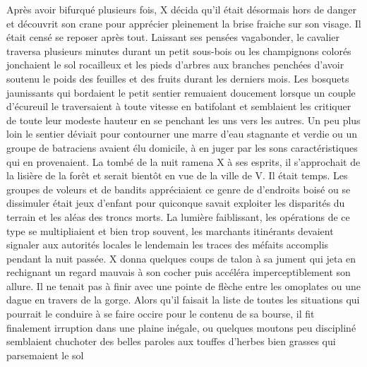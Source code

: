 \documentclass{book}
\begin{document}
Après avoir bifurqué plusieurs fois, X décida qu'il était désormais hors de danger et découvrit son crane pour apprécier pleinement la brise fraiche sur son visage. Il était censé se reposer après tout. Laissant ses pensées vagabonder, le cavalier traversa plusieurs minutes durant un petit sous-bois ou les champignons colorés jonchaient le sol rocailleux et les pieds d'arbres aux branches penchées d'avoir soutenu le poids des feuilles et des fruits durant les derniers mois. Les bosquets jaunissants qui bordaient le petit sentier remuaient doucement lorsque un couple d'écureuil le traversaient à toute vitesse en batifolant et semblaient les critiquer de toute leur modeste hauteur en se penchant les uns vers les autres. Un peu plus loin le sentier déviait pour contourner une marre d'eau stagnante et verdie ou un groupe de batraciens avaient élu domicile, à en juger par les sons caractéristiques qui en provenaient. La tombé de la nuit ramena X à ses esprits, il s'approchait de la lisière de la forêt et serait bientôt en vue de la ville de V. Il était temps.
Les groupes de voleurs et de bandits appréciaient ce genre de d'endroits boisé ou se dissimuler était jeux d'enfant pour quiconque savait exploiter les disparités du terrain et les aléas des troncs morts. La lumière faiblissant, les opérations de ce type se multipliaient et bien trop souvent, les marchants itinérants devaient signaler aux autorités locales le lendemain les traces des méfaits accomplis pendant la nuit passée. \newline
X donna quelques coups de talon à sa jument qui jeta en rechignant un regard mauvais à son cocher puis accéléra imperceptiblement son allure.
Il ne tenait pas à finir avec une pointe de flèche entre les omoplates ou une dague en travers de la gorge.
Alors qu'il faisait la liste de toutes les situations qui pourrait le conduire à se faire occire pour le contenu de sa bourse, il fit finalement irruption dans une plaine inégale, ou quelques moutons peu discipliné semblaient chuchoter des belles paroles aux touffes d'herbes bien grasses qui parsemaient le sol 
\end{document}
